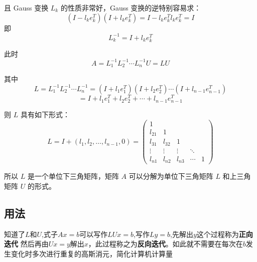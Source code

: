  且 Gauss 变换 \( L_k \) 的性质非常好，Gauss 变换的逆特别容易求：
 \[
 (I - l_k e_k^T)(I + l_k e_k^T) = I - l_k e_k^T l_k e_k^T = I
 \]  
 即  
 \[
 L_k^{-1} = I + l_k e_k^T
 \]  
 
 此时  
 \[
 A = L_1^{-1} L_2^{-1} \cdots L_n^{-1} U = LU
 \]  
 
 其中  
 \[
 L = L_1^{-1} L_2^{-1} \cdots L_n^{-1} = (I + l_1 e_1^T)(I + l_2 e_2^T) \cdots (I + l_{n-1} e_{n-1}^T)
 \]
 \[
 = I + l_1 e_1^T + l_2 e_2^T + \cdots + l_{n-1} e_{n-1}^T
 \]  
 
 则 \( L \) 具有如下形式：
 \[
 L = I + (l_1, l_2, \ldots, l_{n-1}, 0) = 
 \begin{pmatrix}
 1      &        &        &        & \\
 l_{21} & 1      &        &        & \\
 l_{31} & l_{32} & 1      &        & \\
 \vdots & \vdots & \vdots & \ddots & \\
 l_{n1} & l_{n2} & l_{n3} & \cdots & 1
 \end{pmatrix}
 \]  
 
 所以 \( L \) 是一个单位下三角矩阵，矩阵 \( A \) 可以分解为单位下三角矩阵 \( L \) 和上三角矩阵 \( U \) 的形式。
 
\subsection{\textbf{用法}}
知道了$L$和$U$,式子$Ax=b$可以写作$LUx=b$,写作$Ly=b$,先解出$y$这个过程称为\textbf{正向迭代}
然后再由$Ux=y$解出$x$，此过程称之为\textbf{反向迭代}。如此就不需要在每次在$b$发生变化时多次进行重复的高斯消元，简化计算机计算量


